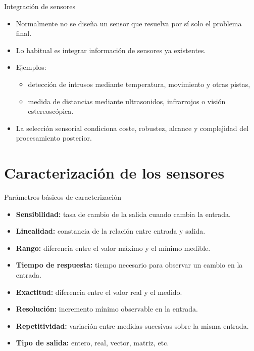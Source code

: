 \documentclass[aspectratio=169]{beamer}
\begin{document}
\begin{frame}{Integración de sensores}
\small
\begin{itemize}
  \item Normalmente no se diseña un sensor que resuelva por sí solo el problema final.
  \item Lo habitual es integrar información de sensores ya existentes.
  \item Ejemplos:
  \begin{itemize}
    \item detección de intrusos mediante temperatura, movimiento y otras pistas,
    \item medida de distancias mediante ultrasonidos, infrarrojos o visión estereoscópica.
  \end{itemize}
  \item La selección sensorial condiciona coste, robustez, alcance y complejidad del procesamiento posterior.
\end{itemize}
\end{frame}

\section{Caracterización de los sensores}

\begin{frame}{Parámetros básicos de caracterización}
\small
\begin{itemize}
  \item \textbf{Sensibilidad:} tasa de cambio de la salida cuando cambia la entrada.
  \item \textbf{Linealidad:} constancia de la relación entre entrada y salida.
  \item \textbf{Rango:} diferencia entre el valor máximo y el mínimo medible.
  \item \textbf{Tiempo de respuesta:} tiempo necesario para observar un cambio en la entrada.
  \item \textbf{Exactitud:} diferencia entre el valor real y el medido.
  \item \textbf{Resolución:} incremento mínimo observable en la entrada.
  \item \textbf{Repetitividad:} variación entre medidas sucesivas sobre la misma entrada.
  \item \textbf{Tipo de salida:} entero, real, vector, matriz, etc.
\end{itemize}
\end{frame}
\end{document}
